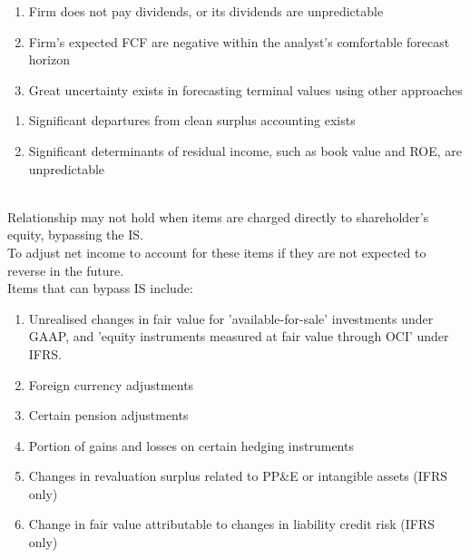 \begin{remark} 
\begin{enumerate}[label=\roman*.]
\setlength{\itemsep}{0pt}
\item Firm does not pay dividends, or its dividends are unpredictable
\item Firm's expected FCF are negative within the analyst's comfortable forecast horizon
\item Great uncertainty exists in forecasting terminal values using other approaches
\end{enumerate}
\end{remark}

\begin{remark} 
\begin{enumerate}[label=\roman*.]
\setlength{\itemsep}{0pt}
\item Significant departures from clean surplus accounting exists
\item Significant determinants of residual income, such as book value and ROE, are unpredictable
\end{enumerate}
\end{remark}

\begin{remark} \\
Relationship may not hold when items are charged directly to shareholder's equity, bypassing the IS.\\
To adjust net income to account for these items if they are not expected to reverse in the future.\\
Items that can bypass IS include:
\begin{enumerate}[label=\roman*.]
\setlength{\itemsep}{0pt}
\item Unrealised changes in fair value for 'available-for-sale' investments under GAAP, and 'equity instruments measured at fair value through OCI' under IFRS.
\item Foreign currency adjustments
\item Certain pension adjustments
\item Portion of gains and losses on certain hedging instruments
\item Changes in revaluation surplus related to PP\&E or intangible assets (IFRS only)
\item Change in fair value attributable to changes in liability credit risk (IFRS only)
\end{enumerate}
\end{remark}

